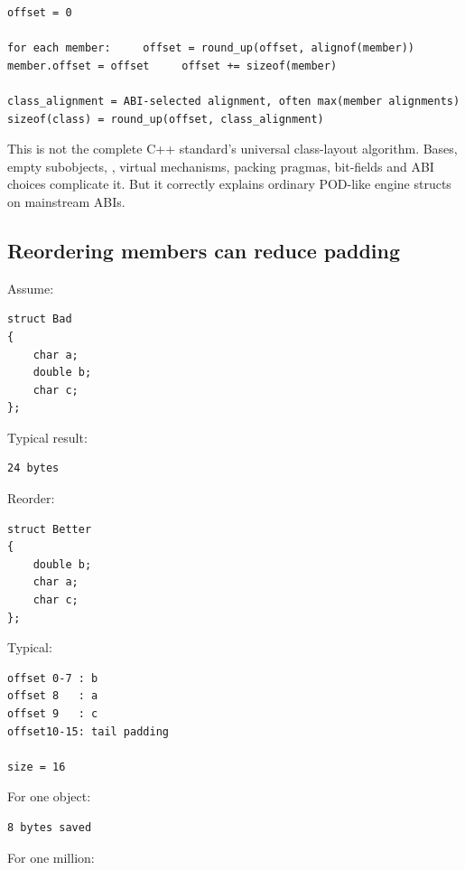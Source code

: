 \begin{verbatim}
offset = 0

for each member:     offset = round_up(offset, alignof(member))     member.offset = offset     offset += sizeof(member)

class_alignment = ABI-selected alignment, often max(member alignments)
sizeof(class) = round_up(offset, class_alignment)
\end{verbatim}

This is not the complete C++ standard's universal class-layout algorithm. Bases, empty subobjects, , virtual mechanisms, packing pragmas, bit-fields and ABI choices complicate it. But it correctly explains ordinary POD-like engine structs on mainstream ABIs.

\subsection{Reordering members can reduce padding}\label{05-engine-i-ch003-reordering-members-can-reduce-padding}

\hypertarget{05-engine-i-ch003-reordering-members-can-reduce-padding}{}

Assume:

\begin{verbatim}
struct Bad
{
    char a;
    double b;
    char c;
};
\end{verbatim}

Typical result:

\begin{verbatim}
24 bytes
\end{verbatim}

Reorder:

\begin{verbatim}
struct Better
{
    double b;
    char a;
    char c;
};
\end{verbatim}

Typical:

\begin{verbatim}
offset 0-7 : b
offset 8   : a
offset 9   : c
offset10-15: tail padding

size = 16
\end{verbatim}

For one object:

\begin{verbatim}
8 bytes saved
\end{verbatim}

For one million:

